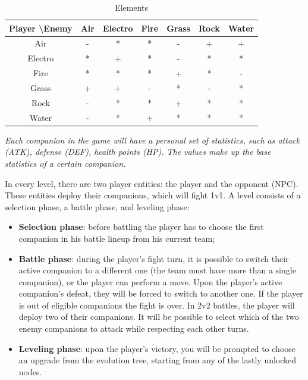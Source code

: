 \documentclass[12pt, a4paper]{report}
\begin{document}
\begin{table}[ht]
    \begin{center}
    \begin{tabular}{| c || c | c | c | c | c | c |}
        \hline
        Player \textbackslash Enemy & Air & Electro & Fire & Grass & Rock & Water \\ [0.5ex]
        \hline\hline
        Air         & - & * & * & - & + & + \\
        \hline
        Electro     & * & + & * & - & * & * \\
        \hline
        Fire        & * & * & * & + & * & - \\
        \hline
        Grass       & + & + & - & * & - & * \\
        \hline
        Rock        & - & * & * & + & * & * \\
        \hline
        Water       & - & * & + & * & * & * \\
        \hline
    \end{tabular}
    \caption{\label{table:elements} Elements}
    \end{center}
\end{table}

    \textit{Each companion in the game will have a personal set of statistics, such as attack (ATK), defense (DEF), health points (HP).
    The values make up the base statistics of a certain companion.}

    In every level, there are two player entities: the player and the opponent (NPC). These entities deploy their companions, which will fight 1v1.
    A level consists of a selection phase, a battle phase, and leveling phase:
\begin{itemize}
    \item \textbf{Selection phase}: before battling the player has to choose the first companion in his battle lineup from his current team;
    \item \textbf{Battle phase}: during the player's fight turn, it is possible to switch their active companion to a different one (the team must have more than a single companion), 
        or the player can perform a move. Upon the player's active companion's defeat, they will be forced to switch to another one. 
        If the player is out of eligible companions the fight is over. In 2v2 battles, the player will deploy two of their companions. 
        It will be possible to select which of the two enemy companions to attack while respecting each other turns.
    \item \textbf{Leveling phase}: upon the player's victory, you will be prompted to choose an upgrade from the evolution tree, starting from any of the lastly unlocked nodes.
\end{itemize}
\end{document}
